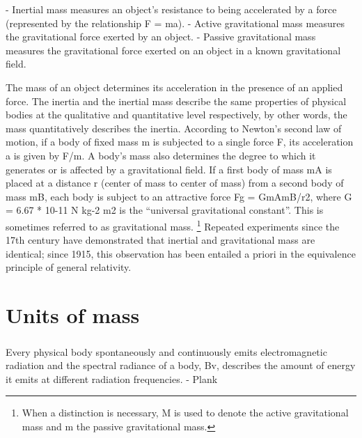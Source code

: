 \documentclass{book}
\begin{document}
	- Inertial mass measures an object's resistance to being accelerated by a force (represented by the relationship F = ma).
	- Active gravitational mass measures the gravitational force exerted by an object.
	- Passive gravitational mass measures the gravitational force exerted on an object in a known gravitational field.
	
	
	The mass of an object determines its acceleration in the presence of an applied force. The inertia and the inertial mass describe the same properties of physical bodies at the qualitative and quantitative level respectively, by other words, the mass quantitatively describes the inertia. According to Newton's second law of motion, if a body of fixed mass m is subjected to a single force F, its acceleration a is given by F/m. A body's mass also determines the degree to which it generates or is affected by a gravitational field. If a first body of mass mA is placed at a distance r (center of mass to center of mass) from a second body of mass mB, each body is subject to an attractive force Fg = GmAmB/r2, where G = 6.67 * 10{-11} N kg{-2} m2 is the ``universal gravitational constant''. This is sometimes referred to as gravitational mass.  \footnote{When a distinction is necessary, M is used to denote the active gravitational mass and m the passive gravitational mass.} Repeated experiments since the 17th century have demonstrated that inertial and gravitational mass are identical; since 1915, this observation has been entailed a priori in the equivalence principle of general relativity.
	
	\chapter{Units of mass}
	
	\paragraph{}
	Every physical body spontaneously and continuously emits electromagnetic radiation and the spectral radiance of a body, Bv, describes the amount of energy it emits at different radiation frequencies. - Plank
	
\end{document}
